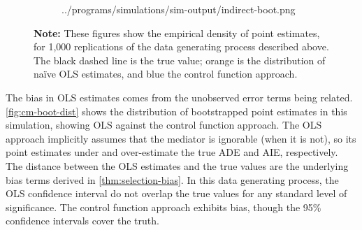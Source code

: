 \begin{figure}[h!]
\begin{subfigure}[c]{0.475\textwidth}
{            ../programs/simulations/sim-output/indirect-boot.png}
    \end{subfigure}
    \label{fig:cm-boot-dist}
    \justify
    \footnotesize    
    \textbf{Note:}
    These figures show the empirical density of point estimates, for 1,000 replications of the data generating process described above.
    The black dashed line is the true value;
    orange is the distribution of na\"ive OLS estimates, and blue the control function approach.
\end{figure}

The bias in OLS estimates comes from the unobserved error terms being related.
\autoref{fig:cm-boot-dist} shows the distribution of bootstrapped point estimates in this simulation, showing OLS against the control function approach.
The OLS approach implicitly assumes that the mediator is ignorable (when it is not), so its point estimates under and over-estimate the true ADE and AIE, respectively.
The distance between the OLS estimates and the true values are the underlying bias terms derived in \autoref{thm:selection-bias}.
In this data generating process, the OLS confidence interval do not overlap the true values for any standard level of significance.
The control function approach exhibits bias, though the 95\% confidence intervals cover the truth.

